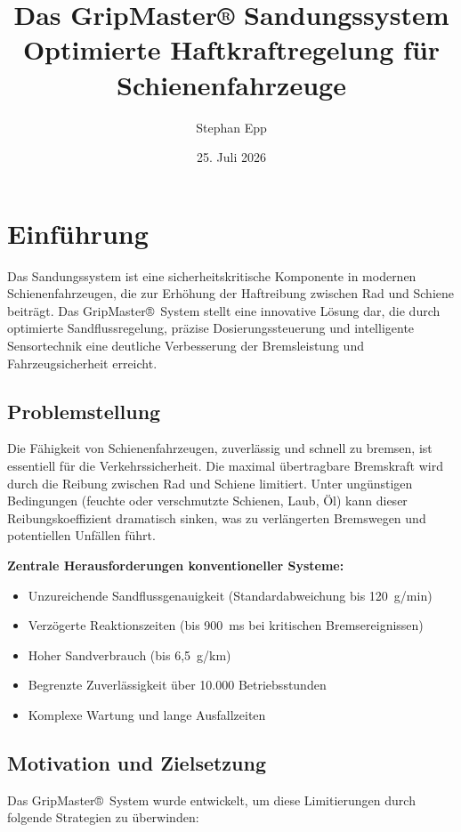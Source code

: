 \documentclass[a4paper,12pt]{article}
\title{Das GripMaster® Sandungssystem\\[10pt]
	\large Optimierte Haftkraftregelung für Schienenfahrzeuge}
\author{Stephan Epp}
\date{25. Juli 2026}
\theoremstyle{definition}
\begin{document}
\maketitle

\tableofcontents
\newpage

\section{Einführung}

Das Sandungssystem ist eine sicherheitskritische Komponente in modernen Schienenfahrzeugen, die zur Erhöhung der Haftreibung zwischen Rad und Schiene beiträgt. Das GripMaster®~System stellt eine innovative Lösung dar, die durch optimierte Sandflussregelung, präzise Dosierungssteuerung und intelligente Sensortechnik eine deutliche Verbesserung der Bremsleistung und Fahrzeugsicherheit erreicht.

\subsection{Problemstellung}

Die Fähigkeit von Schienenfahrzeugen, zuverlässig und schnell zu bremsen, ist essentiell für die Verkehrssicherheit. Die maximal übertragbare Bremskraft wird durch die Reibung zwischen Rad und Schiene limitiert. Unter ungünstigen Bedingungen (feuchte oder verschmutzte Schienen, Laub, Öl) kann dieser Reibungskoeffizient dramatisch sinken, was zu verlängerten Bremswegen und potentiellen Unfällen führt.

\textbf{Zentrale Herausforderungen konventioneller Systeme:}
\begin{itemize}
	\item Unzureichende Sandflussgenauigkeit (Standardabweichung bis 120~g/min)
	\item Verzögerte Reaktionszeiten (bis 900~ms bei kritischen Bremsereignissen)
	\item Hoher Sandverbrauch (bis 6,5~g/km)
	\item Begrenzte Zuverlässigkeit über 10.000 Betriebsstunden
	\item Komplexe Wartung und lange Ausfallzeiten
\end{itemize}

\subsection{Motivation und Zielsetzung}

Das GripMaster®~System wurde entwickelt, um diese Limitierungen durch folgende Strategien zu überwinden:
\end{document}
